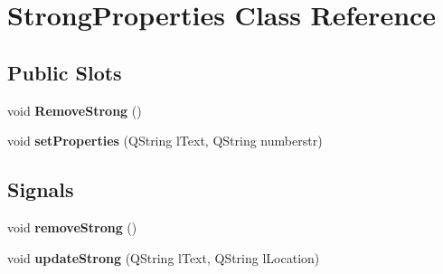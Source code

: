 \hypertarget{classStrongProperties}{
\section{StrongProperties Class Reference}
\label{classStrongProperties}
}
\subsection*{Public Slots}
\begin{DoxyCompactItemize}
\item 
\hypertarget{classStrongProperties_a2c3eb2970628b6fcbe394ffb8306c337}{
void {\bfseries RemoveStrong} ()}
\label{classStrongProperties_a2c3eb2970628b6fcbe394ffb8306c337}

\item 
\hypertarget{classStrongProperties_a554f5bb029102892eed9fd9ca93b5609}{
void {\bfseries setProperties} (QString lText, QString numberstr)}
\label{classStrongProperties_a554f5bb029102892eed9fd9ca93b5609}

\end{DoxyCompactItemize}
\subsection*{Signals}
\begin{DoxyCompactItemize}
\item 
\hypertarget{classStrongProperties_adafb9c5fa7ab8cae7a99e0c3981fca05}{
void {\bfseries removeStrong} ()}
\label{classStrongProperties_adafb9c5fa7ab8cae7a99e0c3981fca05}

\item 
\hypertarget{classStrongProperties_a36f090a997167ff79c900353b1cae4d6}{
void {\bfseries updateStrong} (QString lText, QString lLocation)}
\label{classStrongProperties_a36f090a997167ff79c900353b1cae4d6}

\end{DoxyCompactItemize}
